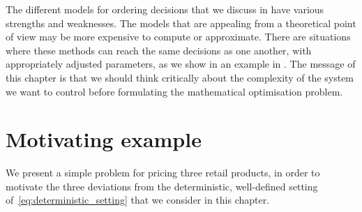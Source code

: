 \documentclass[main.tex]{subfiles}
\begin{document}
The different models for ordering decisions that we discuss in
 have various strengths and
weaknesses. The models that are appealing
from a theoretical point of view may be more expensive to compute or
approximate. There are situations where these methods can reach the
same decisions as one another, with appropriately adjusted parameters, as we show in
an example in . The message of
this chapter is
that we should think critically about the complexity of the system we want
to control before formulating the mathematical optimisation problem.

\section{Motivating example}\label{sec:one_motivating_example}
We present a simple problem for pricing three retail products, in
order to motivate the three deviations from
the deterministic, well-defined setting
of~\eqref{eq:deterministic_setting} that we consider in this chapter.
\end{document}
